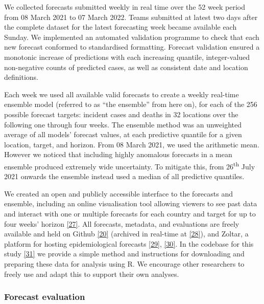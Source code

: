 \documentclass[
]{article}
\begin{document}
We collected forecasts submitted weekly in real time over the 52 week period from 08 March 2021 to 07 March 2022. Teams submitted at latest two days after the complete dataset for the latest forecasting week became available each Sunday. We implemented an automated validation programme to check that each new forecast conformed to standardised formatting. Forecast validation ensured a monotonic increase of predictions with each increasing quantile, integer-valued non-negative counts of predicted cases, as well as consistent date and location definitions.

Each week we used all available valid forecasts to create a weekly real-time ensemble model (referred to as ``the ensemble'' from here on), for each of the 256 possible forecast targets: incident cases and deaths in 32 locations over the following one through four weeks. The ensemble method was an unweighted average of all models' forecast values, at each predictive quantile for a given location, target, and horizon. From 08 March 2021, we used the arithmetic mean. However we noticed that including highly anomalous forecasts in a mean ensemble produced extremely wide uncertainty. To mitigate this, from 26\textsuperscript{th} July 2021 onwards the ensemble instead used a median of all predictive quantiles.

We created an open and publicly accessible interface to the forecasts and ensemble, including an online visualisation tool allowing viewers to see past data and interact with one or multiple forecasts for each country and target for up to four weeks' horizon \protect\hyperlink{ref-europeancovid-19forecasthubEuropeanCovid19Forecast}{{[}27{]}}. All forecasts, metadata, and evaluations are freely available and held on Github \protect\hyperlink{ref-europeancovid-19forecasthubEuropeanCOVID19Forecast2021}{{[}20{]}} (archived in real-time at \protect\hyperlink{ref-katharine_sherratt_2022_7356267}{{[}28{]}}), and Zoltar, a platform for hosting epidemiological forecasts \protect\hyperlink{ref-epiforecastsProjectECDCEuropean2021}{{[}29{]}}, \protect\hyperlink{ref-reichZoltarForecastArchive2021}{{[}30{]}}. In the codebase for this study \protect\hyperlink{ref-PredictivePerformanceMultimodel2022}{{[}31{]}} we provide a simple method and instructions for downloading and preparing these data for analysis using R. We encourage other researchers to freely use and adapt this to support their own analyses.

\hypertarget{forecast-evaluation}{%
\subsubsection{Forecast evaluation}\label{forecast-evaluation}}
\end{document}
